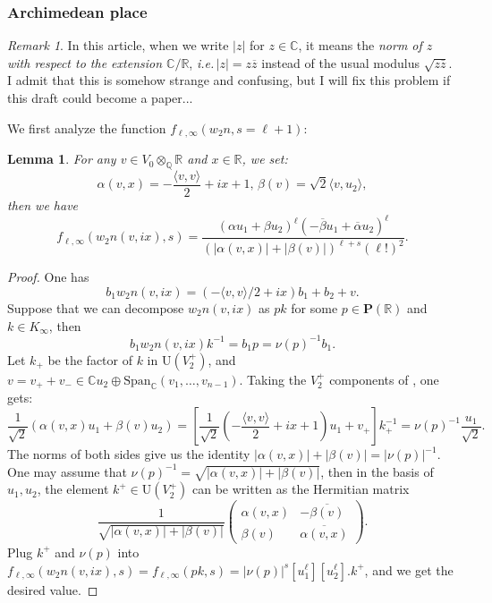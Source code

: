 \documentclass[12pt]{article}
\newtheorem{lemma}[thm]{Lemma}
\theoremstyle{remark}
\newtheorem{rmk}[thm]{Remark}
\theoremstyle{definition}
\newcommand{\C}{\mathbb{C}}
\newcommand{\Q}{\mathbb{Q}}
\newcommand{\R}{\mathbb{R}}
\newcommand{\lrangle}[2]{\langle #1,#2\rangle}
\newcommand{\rmm}[1]{\mathrm{#1}}
\newcommand{\bff}[1]{\mathbf{#1}}
\begin{document}
\subsubsection{Archimedean place}
\label{section archimedean place rank 2 Fourier}
\begin{rmk}\label{rmk complex absolute value}
    In this article,
    when we write $|z|$ for $z\in\C$,
    it means the \emph{norm of $z$ with respect to the extension $\C/\R$},
    \emph{i.e.\,}$|z|=z\overline{z}$ instead of the usual modulus $\sqrt{z\overline{z}}$.
    I admit that this is somehow strange and confusing,
    but I will fix this problem if this draft could become a paper...
\end{rmk}
We first analyze the function $f_{\ell,\infty}(w_{2}n,s=\ell+1)$:
\begin{lemma}
    \label{lemma rank 2 values of archimedean section}
    For any $v\in V_{0}\otimes_{\Q}\R$ and $x\in \R$,
    we set:
    \[\alpha(v,x)=-\frac{\lrangle{v}{v}}{2}+ix+1,\,\beta(v)=\sqrt{2}\lrangle{v}{u_{2}},\]
    then we have 
    \[f_{\ell,\infty}(w_{2}n(v,ix),s)=\frac{(\alpha u_{1}+\beta u_{2})^{\ell}(-\overline{\beta}u_{1}+\overline{\alpha}u_{2})^{\ell}}{(|\alpha(v,x)|+|\beta(v)|)^{\ell+s}(\ell!)^{2}}.\]
\end{lemma}
\begin{proof}
    One has 
    \[b_{1}w_{2}n(v,ix)=(-\lrangle{v}{v}/2+ix)b_{1}+b_{2}+v.\]
    Suppose that we can decompose $w_{2}n(v,ix)$ as $pk$ for some $p\in \bff{P}(\R)$ and $k\in K_{\infty}$,
    then 
    \begin{equation}\label{eqn searching Iwasawa decomposition}
         b_{1}w_{2}n(v,ix)k^{-1}=b_{1}p=\nu(p)^{-1}b_{1}.
    \end{equation}  
    Let $k_{+}$ be the factor of $k$ in $\rmm{U}(V_{2}^{+})$,
    and $v=v_{+}+v_{-}\in \C u_{2}\oplus \rmm{Span}_{\C}(v_{1},\ldots,v_{n-1})$.
    Taking the $V_{2}^{+}$ components of ,
    one gets:
    \[\frac{1}{\sqrt{2}}\left(\alpha(v,x)u_{1}+\beta(v)u_{2}\right)=\left[\frac{1}{\sqrt{2}}\left(-\frac{\lrangle{v}{v}}{2}+ix+1\right)u_{1}+v_{+}\right]k_{+}^{-1}=\nu(p)^{-1}\frac{u_{1}}{\sqrt{2}}.\]
    The norms of both sides give us the identity $|\alpha(v,x)|+|\beta(v)|=|\nu(p)|^{-1}$.
    One may assume that 
    $\nu(p)^{-1}=\sqrt{|\alpha(v,x)|+|\beta(v)|}$,
    then in the basis of $u_{1},u_{2}$,
    the element $k^{+}\in \rmm{U}(V_{2}^{+})$ can be written as the Hermitian matrix 
    \[\frac{1}{\sqrt{|\alpha(v,x)|+|\beta(v)|}}\left(\begin{matrix}
        \alpha(v,x) & -\overline{\beta(v)}\\
        \beta(v) & \overline{\alpha(v,x)}
    \end{matrix}\right).\]
    Plug $k^{+}$ and $\nu(p)$ into $f_{\ell,\infty}(w_{2}n(v,ix),s)=f_{\ell,\infty}(pk,s)=|\nu(p)|^{s}[u_{1}^{\ell}][u_{2}^{\ell}].k^{+}$,
    and we get the desired value.
\end{proof}
\end{document}
